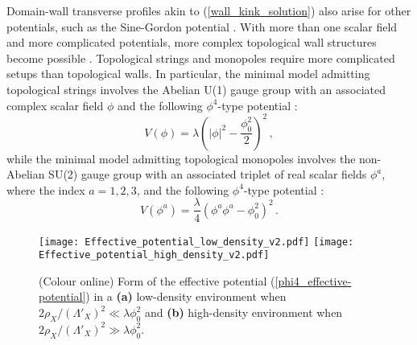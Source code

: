 \documentclass[aps,prd,onecolumn,nofootinbib]{revtex4-2} %
\begin{document}
Domain-wall transverse profiles akin to (\ref{wall_kink_solution}) also arise for other potentials, such as the Sine-Gordon potential \cite{Spergel_1989_walls}. 
With more than one scalar field and more complicated potentials, more complex topological wall structures become possible \cite{Bazeia2002_DWs-review}. 
Topological strings and monopoles require more complicated setups than topological walls. 
In particular, the minimal model admitting topological strings involves the Abelian U(1) gauge group with an associated complex scalar field $\phi$ and the following $\phi^4$-type potential \cite{Abrikosov_1957-vortices,Nielsen-Olesen_1973-strings}: 
\begin{equation}
\label{phi4_potential-strings}
V ( \phi ) = \lambda \left( \left| \phi \right|^2  - \frac{\phi_0^2}{2} \right)^2  \, , 
\end{equation}
while the minimal model admitting topological monopoles involves the non-Abelian SU(2) gauge group with an associated triplet of real scalar fields $\phi^a$, where the index $a=1,2,3$, and the following $\phi^4$-type potential \cite{Hooft_1974-monopoles,Polyakov_1974-monopoles}: 
\begin{equation}
\label{phi4_potential-monopoles}
V ( \phi^a ) = \frac{\lambda}{4} \left( \phi^a \phi^a - \phi_0^2 \right)^2  \, . 
\end{equation}




\begin{figure*}[t!]
\centering
\texttt{[image: Effective\_potential\_low\_density\_v2.pdf]}
\hspace{5mm}
\texttt{[image: Effective\_potential\_high\_density\_v2.pdf]}
\caption{ \normalsize (Colour online) 
Form of the effective potential (\ref{phi4_effective-potential}) in a \textbf{(a)} low-density environment when $2 \rho_X / (\Lambda'_X)^2 \ll \lambda \phi_0^2$ and \textbf{(b)} high-density environment when $2 \rho_X / (\Lambda'_X)^2 \gg \lambda \phi_0^2$. 
}
\label{Fig:Symmetron_potentials}
\end{figure*}
\end{document}
